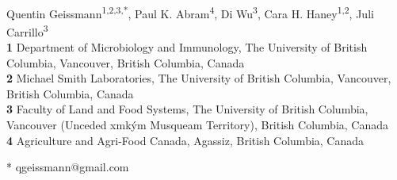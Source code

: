 \documentclass[12pt]{article}
\date{}
\newcommand{\musqueam}{x\super{w}m\textschwa{}\texttheta{}k\super{w}\textschwa{}\'{y}\textschwa{}m}
\begin{document}
	
	
	
\vspace*{0.2in}

\begin{flushleft}
	{\Large
		\textbf{}
	}
	\newline
	\\
	Quentin Geissmann\textsuperscript{1,2,3,*},
	Paul K. Abram\textsuperscript{4},
	Di Wu\textsuperscript{3},
	Cara H. Haney\textsuperscript{1,2},
	Juli Carrillo\textsuperscript{3}
\\
\bigskip
\textbf{1} Department of Microbiology and Immunology, The University of British Columbia, Vancouver, British Columbia, Canada
\\
\textbf{2} Michael Smith Laboratories, The University of British Columbia, Vancouver, British Columbia, Canada
\\
\textbf{3} Faculty of Land and Food Systems, The University of British Columbia, Vancouver (Unceded \musqueam{} Musqueam Territory), British Columbia, Canada
\\
\textbf{4} Agriculture and Agri-Food Canada, Agassiz, British Columbia, Canada
\\
\bigskip

* qgeissmann@gmail.com

\end{flushleft}
	
\end{document}
